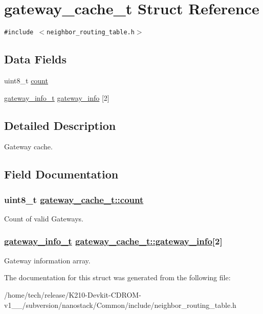 \hypertarget{structgateway__cache__t}{
\section{gateway\_\-cache\_\-t Struct Reference}
\label{structgateway__cache__t}
}
{\tt \#include $<$neighbor\_\-routing\_\-table.h$>$}

\subsection*{Data Fields}
\begin{CompactItemize}
\item 
uint8\_\-t \hyperlink{structgateway__cache__t_743d165f3fdaa99a0e1223a59004510b}{count}
\item 
\hyperlink{structgateway__info__t}{gateway\_\-info\_\-t} \hyperlink{structgateway__cache__t_410691be84519b759fd945c5e05d0be1}{gateway\_\-info} \mbox{[}2\mbox{]}
\end{CompactItemize}


\subsection{Detailed Description}
Gateway cache. 



\subsection{Field Documentation}
\hypertarget{structgateway__cache__t_743d165f3fdaa99a0e1223a59004510b}{
\subsubsection[count]{\setlength{\rightskip}{0pt plus 5cm}uint8\_\-t \hyperlink{structgateway__cache__t_743d165f3fdaa99a0e1223a59004510b}{gateway\_\-cache\_\-t::count}}}
\label{structgateway__cache__t_743d165f3fdaa99a0e1223a59004510b}


Count of valid Gateways. \hypertarget{structgateway__cache__t_410691be84519b759fd945c5e05d0be1}{
\subsubsection[gateway\_\-info]{\setlength{\rightskip}{0pt plus 5cm}\hyperlink{structgateway__info__t}{gateway\_\-info\_\-t} \hyperlink{structgateway__cache__t_410691be84519b759fd945c5e05d0be1}{gateway\_\-cache\_\-t::gateway\_\-info}\mbox{[}2\mbox{]}}}
\label{structgateway__cache__t_410691be84519b759fd945c5e05d0be1}


Gateway information array. 

The documentation for this struct was generated from the following file:\begin{CompactItemize}
\item 
/home/tech/release/K210-Devkit-CDROM-v1\_\_/subversion/nanostack/Common/include/neighbor\_\-routing\_\-table.h\end{CompactItemize}
